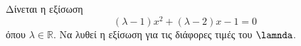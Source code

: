 Δίνεται η εξίσωση
\[ (\lambda-1)x^2+(\lambda-2)x-1=0 \]
όπου $ \lambda\in\mathbb{R} $. Να λυθεί η εξίσωση για τις διάφορες τιμές του $ \lamnda $.
